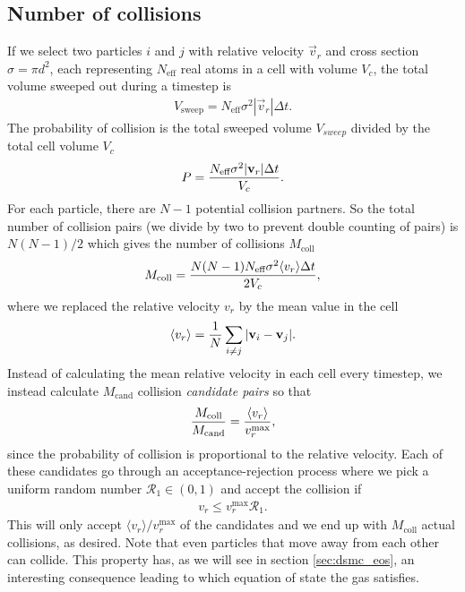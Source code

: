 \subsection{Number of collisions}
If we select two particles $i$ and $j$ with relative velocity $\vec v_r$ and cross section $\sigma=\pi d^2$, each representing $N_\text{eff}$ real atoms in a cell with volume $V_c$, the total volume sweeped out during a timestep is
\begin{align}
	V_\text{sweep} = N_\text{eff}\sigma^2|\vec v_r|\Delta t.
\end{align}
The probability of collision is the total sweeped volume $V_{sweep}$ divided by the total cell volume $V_c$
\begin{align}
	P = {N_\text{eff}\sigma^2|\vec v_r|\Delta t \over V_c}.
\end{align}
For each particle, there are $N-1$ potential collision partners. So the total number of collision pairs (we divide by two to prevent double counting of pairs) is $N(N-1)/2$ which gives the number of collisions $M_\text{coll}$
\begin{align}
	M_\text{coll} = {N(N-1)N_\text{eff}\sigma^2\langle v_r \rangle \Delta t\over 2 V_c},
\end{align}
where we replaced the relative velocity $v_r$ by the mean value in the cell
\begin{align}
	\langle v_r \rangle = {1\over N} \sum_{i\neq j} |\vec v_i - \vec v_j|.
\end{align}
Instead of calculating the mean relative velocity in each cell every timestep, we instead calculate $M_\text{cand}$ collision \textit{candidate pairs} so that
\begin{align}
	{M_\text{coll}\over M_\text{cand}} = {\langle v_r\rangle \over v_r^\text{max}},
\end{align}
since the probability of collision is proportional to the relative velocity. Each of these candidates go through an acceptance-rejection process where we pick a uniform random number $\mathcal{R}_1\in (0,1)$ and accept the collision if
\begin{align}
	v_r \leq v_r^\text{max}\mathcal{R}_1.
\end{align}
This will only accept $\langle v_r\rangle/v_r^\text{max}$ of the candidates and we end up with $M_\text{coll}$ actual collisions, as desired. Note that even particles that move away from each other can collide. This property has, as we will see in section \ref{sec:dsmc_eos}, an interesting consequence leading to which equation of state the gas satisfies.
